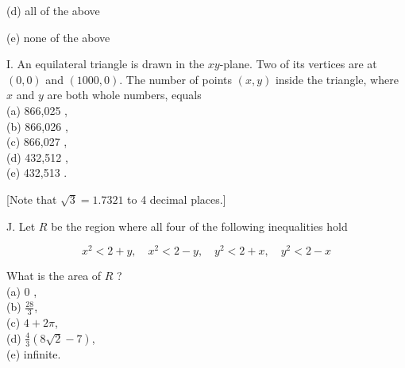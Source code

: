 \documentclass[10pt]{article}
\begin{document}
(d) all of the above

(e) none of the above

I. An equilateral triangle is drawn in the $x y$-plane. Two of its vertices are at $(0,0)$ and $(1000,0)$. The number of points $(x, y)$ inside the triangle, where $x$ and $y$ are both whole numbers, equals\\
(a) 866,025 ,\\
(b) 866,026 ,\\
(c) 866,027 ,\\
(d) 432,512 ,\\
(e) 432,513 .

[Note that $\sqrt{3}=1.7321$ to 4 decimal places.]

J. Let $R$ be the region where all four of the following inequalities hold

$$
x^{2}<2+y, \quad x^{2}<2-y, \quad y^{2}<2+x, \quad y^{2}<2-x
$$

What is the area of $R$ ?\\
(a) 0 ,\\
(b) $\frac{28}{3}$,\\
(c) $4+2 \pi$,\\
(d) $\frac{4}{3}(8 \sqrt{2}-7)$,\\
(e) infinite.
\end{document}
